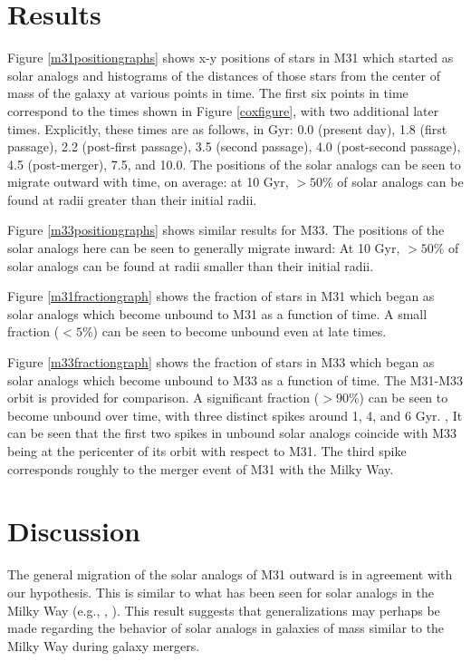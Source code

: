\documentclass{aastex63}
\begin{document}
\section{Results}

Figure \ref{m31positiongraphs} shows x-y positions of stars in M31 which started as solar analogs and histograms of the distances of those stars from the center of mass of the galaxy at various points in time. The first six points in time correspond to the times shown in Figure \ref{coxfigure}, with two additional later times. Explicitly, these times are as follows, in Gyr: 0.0 (present day), 1.8 (first passage), 2.2 (post-first passage), 3.5 (second passage), 4.0 (post-second passage), 4.5 (post-merger), 7.5, and 10.0. The positions of the solar analogs can be seen to migrate outward with time, on average: at 10 Gyr, $>50\%$ of solar analogs can be found at radii greater than their initial radii. 

Figure \ref{m33positiongraphs} shows similar results for M33. The positions of the solar analogs here can be seen to generally migrate inward: At 10 Gyr, $>50\%$ of solar analogs can be found at radii smaller than their initial radii. 

Figure \ref{m31fractiongraph} shows the fraction of stars in M31 which began as solar analogs which become unbound to M31 as a function of time. A small fraction ($<5 \%$) can be seen to become unbound even at late times.

Figure \ref{m33fractiongraph} shows the fraction of stars in M33 which began as solar analogs which become unbound to M33 as a function of time. The M31-M33 orbit is provided for comparison. A significant fraction ($>90 \%$) can be seen to become unbound over time, with three distinct spikes around 1, 4, and 6 Gyr. , It can be seen that the first two spikes in unbound solar analogs coincide with M33 being at the pericenter of its orbit with respect to M31. The third spike corresponds roughly to the merger event of M31 with the Milky Way.

\section{Discussion}

The general migration of the solar analogs of M31 outward is in agreement with our hypothesis. This is similar to what has been seen for solar analogs in the Milky Way (e.g., \cite{cox08}, \cite{van12}). This result suggests that generalizations may perhaps be made regarding the behavior of solar analogs in galaxies of mass similar to the Milky Way during galaxy mergers. 
\end{document}
